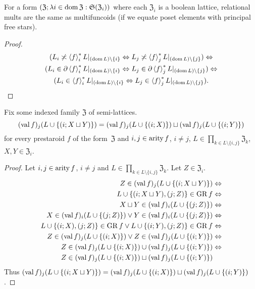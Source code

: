 \begin{prop}
For a form $(\mathfrak{Z};\lambda i\in\operatorname{dom}\mathfrak{Z}:\mathfrak{S}(\mathfrak{Z}_{i}))$
where each $\mathfrak{Z}_{i}$ is a boolean lattice, relational mults
are the same as multifuncoids (if we equate poset elements with principal
free stars).\end{prop}
\begin{proof}
~
\begin{multline*}
(L_{i}\not\asymp\left\langle f\right\rangle ^{\ast}_{i}L|_{(\operatorname{dom} L)\setminus\{i\}}\Leftrightarrow L_{j}\not\asymp\left\langle f\right\rangle ^{\ast}_{j}L|_{(\operatorname{dom} L)\setminus\{j\}})\Leftrightarrow\\
(L_{i}\in\partial\left\langle f\right\rangle ^{\ast}_{i}L|_{(\operatorname{dom} L)\setminus\{i\}}\Leftrightarrow L_{j}\in\partial\left\langle f\right\rangle ^{\ast}_{j}L|_{(\operatorname{dom} L)\setminus\{j\}})\Leftrightarrow\\
(L_{i}\in\left\langle f\right\rangle ^{\ast}_{i}L|_{(\operatorname{dom} L)\setminus\{i\}}\Leftrightarrow L_{j}\in\left\langle f\right\rangle ^{\ast}_{j}L|_{(\operatorname{dom} L)\setminus\{j\}}).
\end{multline*}
\end{proof}
\begin{thm}
Fix some indexed family $\mathfrak{Z}$ of semi-lattices.
\[
(\operatorname{val} f)_{j}(L\cup\{(i;X\sqcup Y)\})=(\operatorname{val} f)_{j}(L\cup\{(i;X)\})\sqcup(\operatorname{val} f)_{j}(L\cup\{(i;Y)\})
\]
for every prestaroid $f$ of the form~$\mathfrak{Z}$ and $i,j\in\operatorname{arity} f$,
$i\neq j$, $L\in\prod_{k\in L\setminus\{i,j\}}\mathfrak{Z}_{k}$,
$X,Y\in\mathfrak{Z}_{i}$.\end{thm}
\begin{proof}
Let $i,j\in\operatorname{arity} f$, $i\ne j$ and $L\in\prod_{k\in L\setminus\{i,j\}}\mathfrak{Z}_{k}$.
Let $Z\in\mathfrak{Z}_{i}$.
\begin{align*}
Z\in(\operatorname{val} f)_{j}(L\cup\{(i;X\sqcup Y)\}) & \Leftrightarrow\\
L\cup\{(i;X\sqcup Y),(j;Z)\}\in\operatorname{GR} f & \Leftrightarrow\\
X\sqcup Y\in(\operatorname{val} f)_{i}(L\cup\{(j;Z)\}) & \Leftrightarrow\\
X\in(\operatorname{val} f)_{i}(L\cup\{(j;Z)\})\lor Y\in(\operatorname{val} f)_{i}(L\cup\{(j;Z)\}) & \Leftrightarrow\\
L\cup\{(i;X),(j;Z)\}\in\operatorname{GR} f\lor L\cup\{(i;Y),(j;Z)\}\in\operatorname{GR} f & \Leftrightarrow\\
Z\in(\operatorname{val} f)_{j}(L\cup\{(i;X)\})\lor Z\in(\operatorname{val} f)_{j}(L\cup\{(i;Y)\}) & \Leftrightarrow\\
Z\in(\operatorname{val} f)_{j}(L\cup\{(i;X)\})\cup(\operatorname{val} f)_{j}(L\cup\{(i;Y)\}) & \Leftrightarrow\\
Z\in(\operatorname{val} f)_{j}(L\cup\{(i;X)\})\sqcup(\operatorname{val} f)_{j}(L\cup\{(i;Y)\})
\end{align*}
Thus $(\operatorname{val} f)_{j}(L\cup\{(i;X\sqcup Y)\})=(\operatorname{val} f)_{j}(L\cup\{(i;X)\})\sqcup(\operatorname{val} f)_{j}(L\cup\{(i;Y)\})$.
\end{proof}
